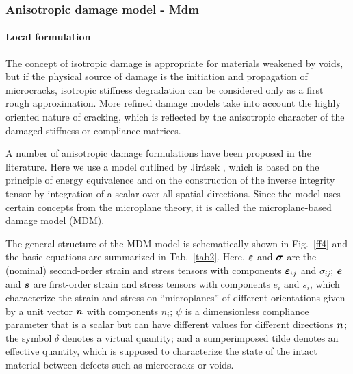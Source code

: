 \documentclass[a4paper]{article}
\newcommand{\mbf}[1]{\mbox{\boldmath$#1$}}
\newcommand{\eps} {\mbf{\varepsilon}}
\newcommand{\ve}{\mbf{e}}%
\newcommand{\veps}{\mbf{\varepsilon}}  %
\newcommand{\vsig}{\mbf{\sigma}}%
\newcommand{\vs}{\mbf{s}}%
\begin{document}
\clearpage

\subsubsection{Anisotropic damage model - Mdm}

\paragraph{Local formulation}

The concept of isotropic damage is appropriate for materials weakened
by voids, but if the physical source of damage is the initiation and
propagation of microcracks, isotropic stiffness degradation
can be considered only as a first rough
approximation. More refined damage models take into account the highly
oriented nature of cracking, which is reflected by the anisotropic
character of the damaged stiffness or compliance matrices.

A number of anisotropic damage formulations have been proposed
in the literature. Here we use a model outlined by Jir\'{a}sek
\cite{mdm}, which is based on the principle of energy
equivalence and on the construction of the inverse integrity
tensor by integration of a scalar over all spatial directions.
Since the model uses certain concepts from the
microplane theory, it is called the microplane-based damage model (MDM).

The general structure of the MDM
model is schematically shown in Fig.\ \ref{ff4}
and the basic equations are summarized in Tab.~\ref{tab2}.
Here, $\veps$ and $\vsig$ are the (nominal) second-order
strain and stress tensors
with components $\eps_{ij}$ and $\sigma_{ij}$; $\ve$ and $\vs$
are first-order strain and stress tensors with components $e_i$
and $s_i$, which characterize the strain and stress on ``microplanes''
of different orientations given by a unit vector $\mbf{n}$
with components $n_i$;
$\psi$ is a dimensionless compliance parameter
that is a scalar but can have different values for different
directions $\mbf{n}$;
the symbol $\delta$ denotes a virtual quantity; and a sumperimposed
tilde denotes an effective quantity, which is supposed to characterize the
state of the intact material between defects such as microcracks or voids.
\end{document}
